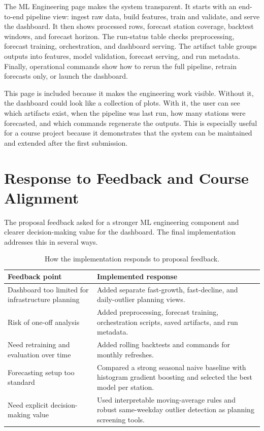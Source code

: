 \documentclass[11pt]{article}
\begin{document}
The ML Engineering page makes the system transparent. It starts with an end-to-end pipeline view: ingest raw data, build features, train and validate, and serve the dashboard. It then shows processed rows, forecast station coverage, backtest windows, and forecast horizon. The run-status table checks preprocessing, forecast training, orchestration, and dashboard serving. The artifact table groups outputs into features, model validation, forecast serving, and run metadata. Finally, operational commands show how to rerun the full pipeline, retrain forecasts only, or launch the dashboard.

This page is included because it makes the engineering work visible. Without it, the dashboard could look like a collection of plots. With it, the user can see which artifacts exist, when the pipeline was last run, how many stations were forecasted, and which commands regenerate the outputs. This is especially useful for a course project because it demonstrates that the system can be maintained and extended after the first submission.

\section{Response to Feedback and Course Alignment}

The proposal feedback asked for a stronger ML engineering component and clearer decision-making value for the dashboard. The final implementation addresses this in several ways.

\begin{table}[H]
\centering
\caption{How the implementation responds to proposal feedback.}
\small
\begin{tabularx}{0.96\textwidth}{lX}
\toprule
\textbf{Feedback point} & \textbf{Implemented response} \\
\midrule
Dashboard too limited for infrastructure planning & Added separate fast-growth, fast-decline, and daily-outlier planning views. \\
Risk of one-off analysis & Added preprocessing, forecast training, orchestration scripts, saved artifacts, and run metadata. \\
Need retraining and evaluation over time & Added rolling backtests and commands for monthly refreshes. \\
Forecasting setup too standard & Compared a strong seasonal naive baseline with histogram gradient boosting and selected the best model per station. \\
Need explicit decision-making value & Used interpretable moving-average rules and robust same-weekday outlier detection as planning screening tools. \\
\bottomrule
\end{tabularx}
\end{table}
\end{document}
